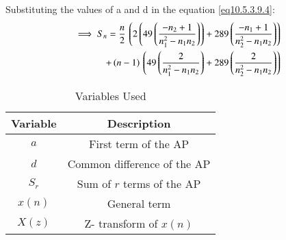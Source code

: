 \documentclass[journal,12pt,twocolumn]{IEEEtran}
\theoremstyle{remark}
\begin{document}
 Substituting the values of a and d in the equation \ref{eq10.5.3.9.4}:
 \begin{align}
     \implies S_n = \frac{n}{2}\,\left(2\left(49\left(\frac{-n_2+1}{n_1^2-n_1n_2}\right)\right)+289\left(\frac{-n_1+1}{n_2^2-n_1n_2}\right)\right)\notag\\
     +\left(n-1\right)\,\left(49\left(\frac{2}{n_1^2-n_1n_2}\right)+289\left(\frac{2}{n_2^2-n_1n_2}\right)\right)
 \end{align}
 \begin{table}[h]
    \centering
    \renewcommand\thetable{1}
    \begin{tabular}[12.1pt]{ |c| c|}
    \hline
    \textbf{Variable} & \textbf{Description} \\ 
    \hline
    $a$ & First term of the AP \\
    \hline 
    $d$ & Common difference of the AP \\
    \hline
    $S_r$ & Sum of $r$ terms of the AP \\
    \hline
    $x(n)$ & General term \\
    \hline
    $X(z)$ & Z- transform of $x(n)$\\
    \hline    
    \end{tabular}
    \caption{Variables Used}
\end{table}
\end{document}
